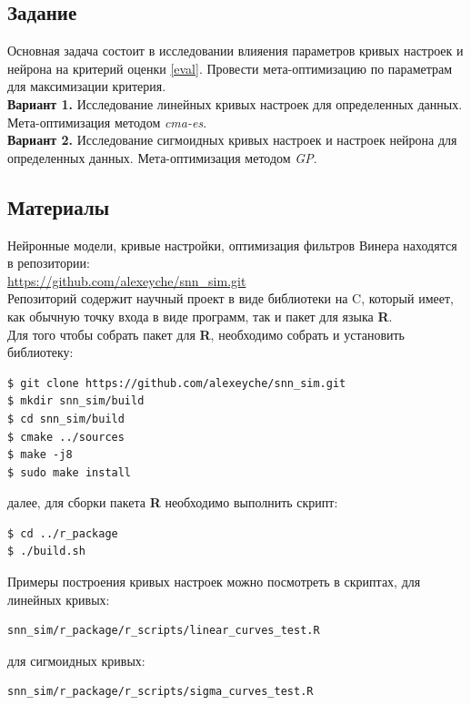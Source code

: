 \documentclass[a4paper,10pt,usenames]{article}
\begin{document}
\subsection{Задание}
\indent Основная задача состоит в исследовании влияения параметров кривых настроек и нейрона на критерий оценки \eqref{eval}. Провести мета-оптимизацию по параметрам для максимизации критерия.\\
\textbf{Вариант 1.} Исследование линейных кривых настроек для определенных данных. Мета-оптимизация методом \textit{cma-es}.\\
\textbf{Вариант 2.} Исследование сигмоидных кривых настроек и настроек нейрона для определенных данных. Мета-оптимизация методом \textit{GP}. \\
\subsection{Материалы}
Нейронные модели, кривые настройки, оптимизация фильтров Винера находятся в репозитории:\\
\url{https://github.com/alexeyche/snn_sim.git} \\ 
\indent Репозиторий содержит научный проект в виде библиотеки на C, который имеет, как обычную точку входа в виде программ, так и пакет для языка \textbf{R}.\\
\indent Для того чтобы собрать пакет для \textbf{R}, необходимо собрать и установить библиотеку:
\begin{lstlisting}
$ git clone https://github.com/alexeyche/snn_sim.git
$ mkdir snn_sim/build
$ cd snn_sim/build 
$ cmake ../sources
$ make -j8
$ sudo make install
\end{lstlisting}
далее, для сборки пакета \textbf{R} необходимо выполнить скрипт:
\begin{lstlisting}
$ cd ../r_package
$ ./build.sh 
\end{lstlisting}
Примеры построения кривых настроек можно посмотреть в скриптах, для линейных кривых:\\
\begin{lstlisting}
snn_sim/r_package/r_scripts/linear_curves_test.R
\end{lstlisting}
для сигмоидных кривых: \\
\begin{lstlisting}
snn_sim/r_package/r_scripts/sigma_curves_test.R
\end{lstlisting}
\end{document}
